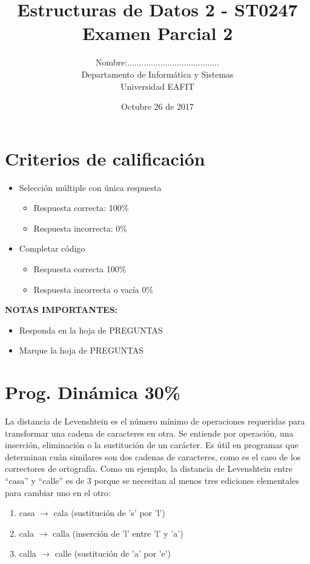\documentclass[twocolumn]{article}
\author{
Nombre:....................................... \\
    Departamento de Informática y Sistemas \\
    Universidad EAFIT \\
}
\title{
    Estructuras de Datos 2 - ST0247 \\
    Examen Parcial 2
}
\date{
    Octubre 26 de 2017
}
\begin{document}
\vspace{-5cm}
\maketitle


\section*{Criterios de calificación}

\begin{itemize}
\item Selección múltiple con única respuesta
\begin{itemize}
\item Respuesta correcta: 100\%
\item Respuesta incorrecta: 0\%
\end{itemize}

\item Completar código
\begin{itemize}
\item Respuesta correcta 100\%
\item Respuesta incorrecta o vacía 0\%
\end{itemize}
\end{itemize}


\textbf{NOTAS IMPORTANTES:}
\begin{itemize}
	\item Responda en la hoja de PREGUNTAS
	\item Marque la hoja de PREGUNTAS
\end{itemize}

\section{Prog. Dinámica 30\%}
La distancia de Levenshtein es el número mínimo de operaciones requeridas para transformar una cadena de caracteres en otra. Se entiende por operación, una inserción, eliminación o la sustitución de un carácter. Es útil en programas que determinan cuán similares son dos cadenas de caracteres, como es el caso de los correctores de ortografía. Como un ejemplo, la distancia de Levenshtein entre ``casa'' y ``calle'' es de $3$ porque se necesitan al menos tres ediciones elementales para cambiar uno en el otro:

\begin{enumerate}
   \item casa $\rightarrow$ cala (sustitución de 's' por 'l')
  \item  cala $\rightarrow$ calla (inserción de 'l' entre 'l' y 'a')
   \item calla $\rightarrow$ calle (sustitución de 'a' por 'e')
\end{enumerate}
\end{document}
